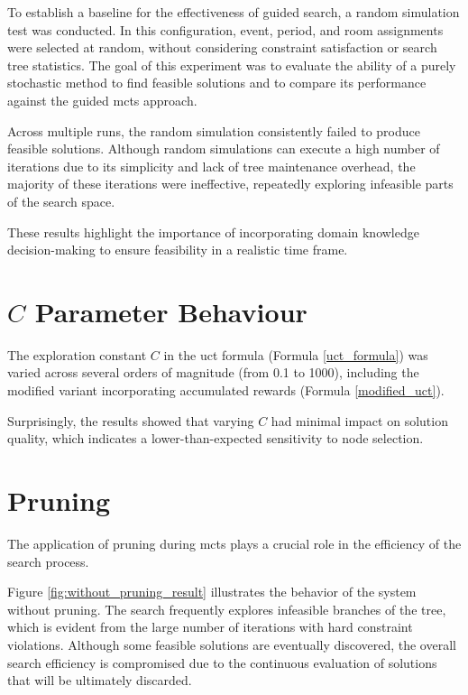 To establish a baseline for the effectiveness of guided search, a random simulation test was conducted.  In this configuration, event, period, and room assignments were selected at random, without considering constraint satisfaction or search tree statistics. The goal of this experiment was to evaluate the ability of a purely stochastic method to find feasible solutions and to compare its performance against the guided \ac{mcts} approach. 

Across multiple runs, the random simulation consistently failed to produce feasible solutions. Although random simulations can execute a high number of iterations due to its simplicity and lack of tree maintenance overhead, the majority of these iterations were ineffective, repeatedly exploring infeasible parts of the search space. 

These results highlight the importance of incorporating domain knowledge decision-making to ensure feasibility in a realistic time frame.

\section{\(C\) Parameter Behaviour}

The exploration constant \(C\) in the \ac{uct} formula (Formula \ref{uct_formula}) was varied across several orders of magnitude (from 0.1 to 1000), including the modified variant incorporating accumulated rewards (Formula \ref{modified_uct}). 

Surprisingly, the results showed that varying \(C\) had minimal impact on solution quality, which indicates a lower-than-expected sensitivity to node selection.

\section{Pruning}

The application of pruning during \ac{mcts} plays a crucial role in the efficiency of the search process.

Figure \ref{fig:without_pruning_result} illustrates the behavior of the system without pruning. The search frequently explores infeasible branches of the tree, which is evident from the large number of iterations with hard constraint violations. Although some feasible solutions are eventually discovered, the overall search efficiency is compromised due to the continuous evaluation of solutions that will be ultimately discarded.

